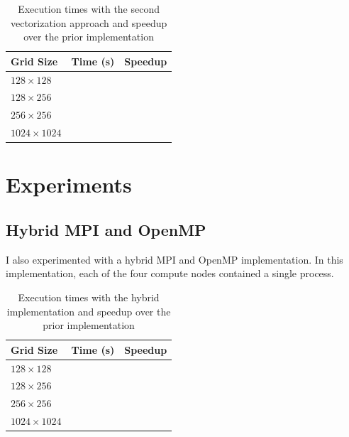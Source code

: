 \documentclass[twocolumn, a4paper]{article}
\begin{document}
\begin{table}[htbp]
  \begin{center}
  \caption{Execution times with the second vectorization approach and speedup over the prior implementation}\label{tab:vectorization_2}
  \begin{tabular}[t]{l | l l} 
      \hline\hline
      Grid Size&Time (s)&Speedup\\
      \hline
      $128 \times 128$&\texttt{}&\texttt{}\\
      $128 \times 256$&\texttt{}&\texttt{}\\
      $256 \times 256$&\texttt{}&\texttt{}\\
      $1024 \times 1024$&\texttt{}&\texttt{}\\
      \hline
    \end{tabular}
  \end{center}
\end{table}

\section{Experiments}

\subsection{Hybrid MPI and OpenMP}

I also experimented with a hybrid MPI and OpenMP implementation.
In this implementation, each of the four compute nodes contained a single process.

\begin{table}[htbp]
  \begin{center}
  \caption{Execution times with the hybrid implementation and speedup over the prior implementation}\label{tab:hybrid}
  \begin{tabular}[t]{l | l l} 
      \hline\hline
      Grid Size&Time (s)&Speedup\\
      \hline
      $128 \times 128$&\texttt{}&\texttt{}\\
      $128 \times 256$&\texttt{}&\texttt{}\\
      $256 \times 256$&\texttt{}&\texttt{}\\
      $1024 \times 1024$&\texttt{}&\texttt{}\\
      \hline
    \end{tabular}
  \end{center}
\end{table}
\end{document}
